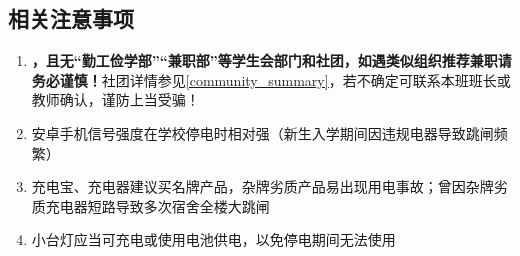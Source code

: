 \subsection[相关注意事项]{相关注意事项}
\begin{enumerate}
    \item \textbf{，且无“勤工俭学部”“兼职部”等学生会部门和社团，如遇类似组织推荐兼职请务必谨慎！}社团详情参见\uline{\ref{community_summary}}，若不确定可联系本班班长或教师确认，谨防上当受骗！
    \item 安卓手机信号强度在学校停电时相对强（新生入学期间因违规电器导致跳闸频繁）
    \item 充电宝、充电器建议买名牌产品，杂牌劣质产品易出现用电事故；曾因杂牌劣质充电器短路导致多次宿舍全楼大跳闸
    \item 小台灯应当可充电或使用电池供电，以免停电期间无法使用
\end{enumerate}